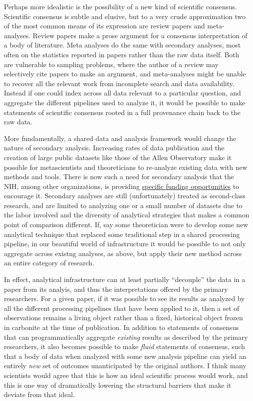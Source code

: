 \documentclass[nohyper]{tufte-book-jls}
\begin{document}
Perhaps more idealistic is the possibility of a new kind of scientific
consensus. Scientific consensus is subtle and elusive, but to a very
crude approximation two of the most common means of its expression are
review papers and meta-analyses. Review papers make a prose argument for
a consensus interpretation of a body of literature. Meta analyses do the
same with secondary analyses, most often on the statistics reported in
papers rather than the raw data itself. Both are vulnerable to sampling
problems, where the author of a review may selectively cite papers to
make an argument, and meta-analyses might be unable to recover all the
relevant work from incomplete search and data availability. Instead if
one could index across all data relevant to a particular question, and
aggregate the different pipelines used to analyze it, it would be
possible to make statements of scientific consensus rooted in a full
provenance chain back to the raw data.

More fundamentally, a shared data and analysis framework would change
the nature of secondary analysis. Increasing rates of data publication
and the creation of large public datasets like those of the Allen
Observatory make it possible for metascientists and theoreticians to
re-analyze existing data with new methods and tools. There is now such a
need for secondary analysis that the NIH, among other organizations, is
providing
\href{https://grants.nih.gov/grants/guide/rfa-files/rfa-mh-20-120.html}{specific
funding opportunities} to encourage it. Secondary analyses are still
(unfortunately) treated as second-class research, and are limited to
analyzing one or a small number of datasets due to the labor involved
and the diversity of analytical strategies that makes a common point of
comparison different. If, say some theoretician were to develop some new
analytical technique that replaced some traditional step in a shared
processing pipeline, in our beautiful world of infrastructure it would
be possible to not only aggregate across existng analyses, as above, but
apply their new method across an entire category of research.

In effect, analytical infrastructure can at least partially ``decouple''
the data in a paper from its analyis, and thus the interpretations
offered by the primary researchers. For a given paper, if it was
possible to see its results as analyzed by all the different processing
pipelines that have been applied to it, then a set of observations
remains a living object rather than a fixed, historical object frozen in
carbonite at the time of publication. In addition to statements of
consensus that can programmatically aggregate \emph{existing} results as
described by the primary researchers, it also becomes possible to make
\emph{fluid} statements of consensus, such that a body of data when
analyzed with some new analysis pipeline can yield an entirely
\emph{new} set of outcomes unanticipated by the original authors. I
think many scientists would agree that this is how an ideal scientific
process would work, and this is one way of dramatically lowering the
structural barriers that make it deviate from that ideal.
\end{document}
